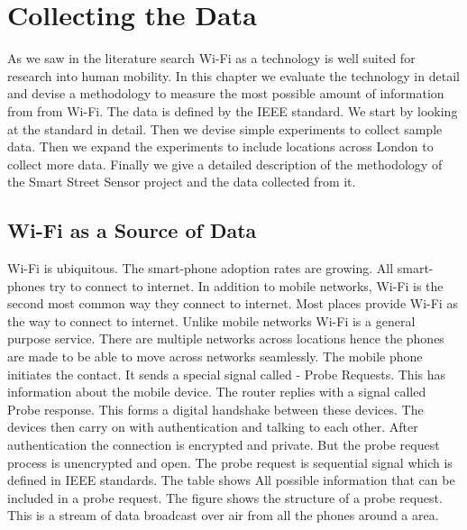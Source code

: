 \chapter{Collecting the Data}

As we saw in the literature search Wi-Fi as a technology is well suited for research into human mobility.
In this chapter we evaluate the technology in detail and devise a methodology to
measure the most possible amount of information from from Wi-Fi.
The data is defined by the IEEE standard.
We start by looking at the standard in detail.
Then we devise simple experiments to collect sample data.
Then we expand the experiments to include locations across London to collect more data.
Finally we give a detailed description of the methodology of the Smart Street Sensor project and the data collected from it.

\section{Wi-Fi as a Source of Data}

Wi-Fi is ubiquitous.
The smart-phone adoption rates are growing.
All smart-phones try to connect to internet.
In addition to mobile networks, Wi-Fi is the second most common way they connect to internet.
Most places provide Wi-Fi as the way to connect to internet.
Unlike mobile networks Wi-Fi is a general purpose service.
There are multiple networks across locations hence the phones are made to be able to move across networks seamlessly.
The mobile phone initiates the contact.
It sends a special signal called - Probe Requests.
This has information about the mobile device.
The router replies with a signal called Probe response.
This forms a digital handshake between these devices.
The devices then carry on with authentication and talking to each other.
After authentication the connection is encrypted and private.
But the probe request process is unencrypted and open.
The probe request is sequential signal which is defined in IEEE standards.
The table shows All possible information that can be included in a probe request.
The figure shows the structure of a probe request.
This is a stream of data broadcast over air from all the phones around a area. 

